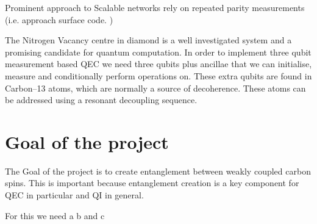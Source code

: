 Prominent approach to Scalable networks rely on repeated parity measurements (i.e. approach surface code. )







The Nitrogen Vacancy centre in diamond is a well investigated system\citep{Doherty2013NitrogenVacancy} and a promising candidate for quantum computation\citep{Childress2013Diamond}. In order to implement three qubit measurement based QEC we need three qubits plus ancillae that we can initialise, measure and conditionally perform operations on. These extra qubits are found in Carbon--13 atoms, which are normally a source of decoherence. These atoms can be addressed using a resonant decoupling sequence\citep{Taminiau2012Detection}.


\section{Goal of the project}
The Goal of the project is to create entanglement between weakly coupled carbon spins.
This is important because entanglement creation is a key component for QEC in particular and QI in general.

For this we need a b and c
